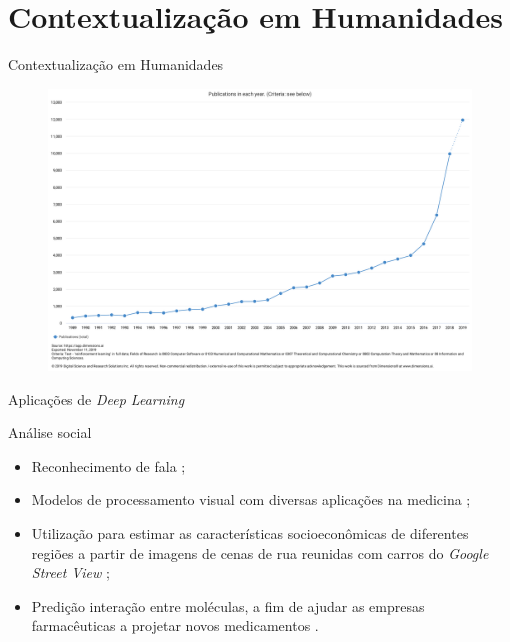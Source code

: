 \documentclass[aspectratio=169]{beamer}
\begin{document}
\section{Contextualização em Humanidades}
\begin{frame}{Contextualização em Humanidades}

	\begin{figure}[h]
	  \centering
	  \includegraphics[width=.7 \textwidth]{imgs/rl-publications-overview.pdf}
	  \label{publications-overview}
	 \end{figure}
\end{frame}

\begin{frame}{Aplicações de \textit{Deep Learning}}
	\begin{block}{Análise social}
		\begin{itemize}
			\item Reconhecimento de fala \cite{nassif:speech-rec:2019};
			\item Modelos de processamento visual com diversas aplicações na medicina \cite{Yeung:comp-vis:2019};
			\item Utilização para estimar as características socioeconômicas de diferentes regiões a partir de imagens de cenas de rua reunidas com carros do \textit{Google Street View} \cite{Gebru13108};
			\item Predição interação entre moléculas, a fim de ajudar as empresas farmacêuticas a projetar novos medicamentos \cite{dahl2014multitask}.
		\end{itemize}
	\end{block}
\end{frame}
\end{document}
